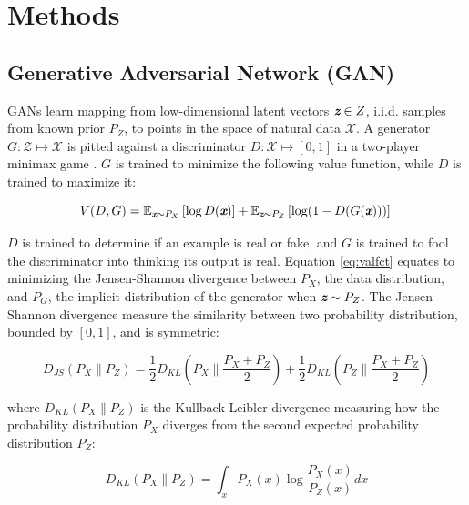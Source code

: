 \documentclass{article} %
\newcommand{\e}{\mathbb E}
\begin{document}
\section{Methods}

\subsection{Generative Adversarial Network (GAN)}
GANs learn mapping from low-dimensional latent vectors $\textit{\textbf{z}}\in Z$, i.i.d. samples from known prior $P_Z$, to points in the space of natural data $\mathcal{X}$. A generator $G : \mathcal{Z} \mapsto \mathcal{X}$ is pitted against a discriminator $D : \mathcal{X} \mapsto \left[0,1\right]$ in a two-player minimax game \cite{goodfellow2014}. $G$ is trained to minimize the following value function, while $D$ is trained to maximize it:

\begin{equation}
    V(D,G) = \e_{\textit{\textbf{x}}\sim P_X} \left[\log D(\textit{\textbf{x}})\right] + \e_{\textit{\textbf{z}}\sim P_Z} \left[\log (1-D(G(\textit{\textbf{x}})))\right] \\
    \label{eq:valfct}
\end{equation}

$D$ is trained to determine if an example is real or fake, and $G$ is trained to fool the discriminator into thinking its output is real. Equation \ref{eq:valfct} equates to minimizing the Jensen-Shannon divergence between $P_X$, the data distribution, and $P_G$, the implicit distribution of the generator when $\textit{\textbf{z}}\sim P_Z$. The Jensen-Shannon divergence measure the similarity between two probability distribution, bounded by $\left[0,1\right]$, and is symmetric:

\begin{equation}
    D_{JS}(P_X\| P_Z) = \frac{1}{2}D_{KL}\left(P_X\| \frac{P_X+P_Z}{2}\right) +\frac{1}{2}D_{KL}\left(P_Z\| \frac{P_X+P_Z}{2}\right)
\end{equation}

where $D_{KL}(P_X\| P_Z)$ is the Kullback-Leibler divergence measuring how the probability distribution $P_X$ diverges from the second expected probability distribution $P_Z$:

\begin{equation}
    D_{KL}(P_X\| P_Z)=\int_x P_X(x)\log \frac{P_X(x)}{P_Z(x)}dx
\end{equation}
\end{document}
